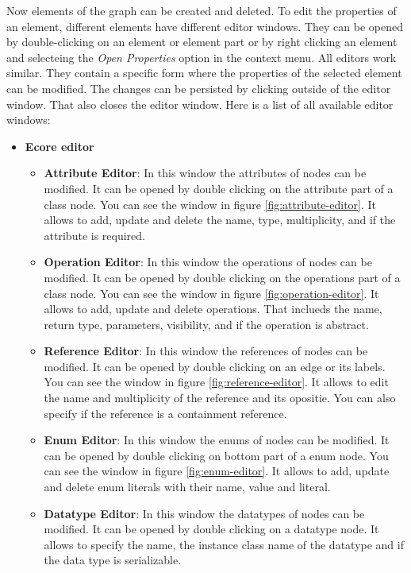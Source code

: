 Now elements of the graph can be created and deleted. To edit the properties of an element, different elements have different editor windows. They can be opened by double-clicking on an element or element part or by right clicking an element and selecteing the \textit{Open Properties} option in the context menu. All editors work similar. They contain a specific form where the properties of the selected element can be modified. The changes can be persisted by clicking outside of the editor window. That also closes the editor window. Here is a list of all available editor windows:

\begin{itemize}
    \item \textbf{Ecore editor}
    \begin{itemize}
        \item \textbf{Attribute Editor}: In this window the attributes of nodes can be modified. It can be opened by double clicking on the attribute part of a class node. You can see the window in figure \ref{fig:attribute-editor}. It allows to add, update and delete the name, type, multiplicity, and if the attribute is required. 
        \item \textbf{Operation Editor}: In this window the operations of nodes can be modified. It can be opened by double clicking on the operations part of a class node. You can see the window in figure \ref{fig:operation-editor}. It allows to add, update and delete operations. That inclueds the name, return type, parameters, visibility, and if the operation is abstract.
        \item \textbf{Reference Editor}: In this window the references of nodes can be modified. It can be opened by double clicking on an edge or its labels. You can see the window in figure \ref{fig:reference-editor}. It allows to edit the name and multiplicity of the reference and its opositie. You can also specify if the reference is a containment reference.
        \item \textbf{Enum Editor}: In this window the enums of nodes can be modified. It can be opened by double clicking on bottom part of a enum node. You can see the window in figure \ref{fig:enum-editor}. It allows to add, update and delete enum literals with their name, value and literal.
        \item \textbf{Datatype Editor}: In this window the datatypes of nodes can be modified. It can be opened by double clicking on a datatype node. It allows to specify the name, the instance class name of the datatype and if the data type is serializable.

\end{itemize}
\end{itemize}
